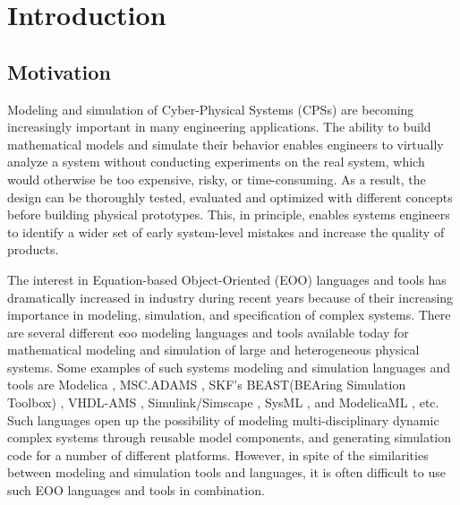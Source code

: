 

\chapter{Introduction}
\label{cha:introduction}


\section{Motivation}
\label{sec:motivation}

Modeling and simulation of Cyber-Physical Systems (CPSs) are becoming increasingly important in many engineering applications. The ability to build mathematical models and simulate their behavior enables engineers to virtually analyze a system without conducting experiments on the real system, which would otherwise be too expensive, risky, or time-consuming. As a result, the design can be thoroughly tested, evaluated and optimized with different concepts before building physical prototypes. This, in principle, enables systems engineers to identify a wider set of early system-level mistakes and increase the quality of products.

The interest in Equation-based Object-Oriented (EOO) languages and tools has dramatically increased in industry during recent years because of their increasing importance in modeling, simulation, and specification of complex systems. There are several different \acrshort{eoo} modeling languages and tools available today for mathematical modeling and simulation of large and heterogeneous physical systems. Some examples of such systems modeling and simulation languages and tools are Modelica \cite{modelica}, MSC.ADAMS \cite{adams}, SKF’s BEAST(BEAring Simulation Toolbox) \cite{beast}, VHDL-AMS \cite{vhdlamsernst, vhdlamsieee}, Simulink/Simscape \cite{simulink}, SysML \cite{sysml,sysmlmorgan}, and ModelicaML \cite{modelicamlreport, modelicaml}, etc. Such languages open up the possibility of modeling multi-disciplinary dynamic complex systems through reusable model components, and generating simulation code for a number of different platforms. However, in spite of the similarities between modeling and simulation tools and languages, it is often difficult to use such EOO languages and tools in combination.

